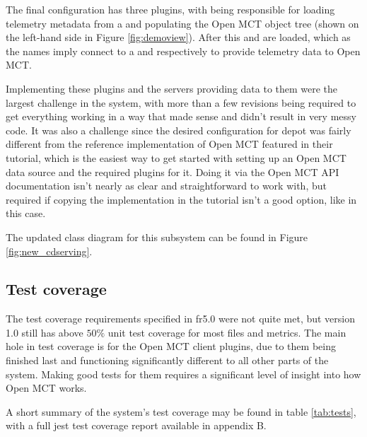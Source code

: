 The final configuration has three plugins, with  being responsible for loading telemetry metadata from a  and populating the Open MCT object tree (shown on the left-hand side in Figure \ref{fig:demoview}). After this  and  are loaded, which as the names imply connect to a  and  respectively to provide telemetry data to Open MCT.

Implementing these plugins and the servers providing data to them were the largest challenge in the system, with more than a few revisions being required to get everything working in a way that made sense and didn't result in very messy code. It was also a challenge since the desired configuration for \Gls{depot} was fairly different from the reference implementation of Open MCT featured in their tutorial, which is the easiest way to get started with setting up an Open MCT data source and the required plugins for it. Doing it via the Open MCT API documentation isn't nearly as clear and straightforward to work with, but required if copying the implementation in the tutorial isn't a good option, like in this case.

The updated class diagram for this subsystem can be found in Figure \ref{fig:new_cdserving}.

\subsection{Test coverage}
The test coverage requirements specified in \acrshort{fr}5.0 were not quite met, but version 1.0 still has above $50\%$ unit test coverage for most files and metrics. The main hole in test coverage is for the Open MCT client plugins, due to them being finished last and functioning significantly different to all other parts of the system. Making good tests for them requires a significant level of insight into how Open MCT works.

A short summary of the system's test coverage may be found in table \ref{tab:tests}, with a full \Gls{jest} test coverage report available in appendix B.

